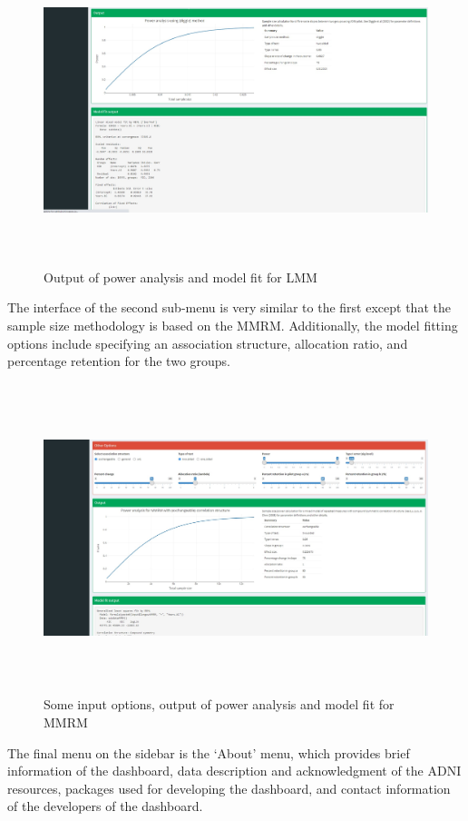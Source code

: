 \begin{figure}[ht]
	\includegraphics[width=14cm,height=9cm]{./Figures/FigADNIOutput3.jpg}
	\caption{Output of power analysis and model fit for LMM}\label{ADNIOutput3}
\end{figure}
The interface of the second sub-menu is very similar to the first except that the sample size methodology is based on the MMRM. Additionally, the model fitting options include specifying an association structure, allocation ratio, and percentage retention for the two groups. 

\begin{figure}[ht]
	\includegraphics[width=14cm,height=9cm]{./Figures/FigADNImmrm.jpg}
	\caption{Some input options, output of power analysis and model fit for MMRM}\label{ADNIOutput4}
\end{figure}

The final menu on the sidebar is the `About' menu, which provides brief information of the dashboard, data description and acknowledgment of the ADNI resources, packages used for developing the dashboard, and contact information of the developers of the dashboard. 

